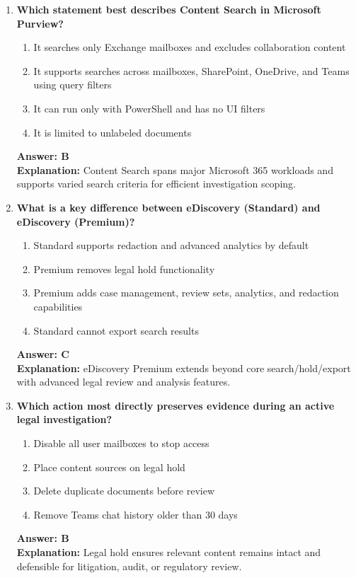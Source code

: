 \documentclass[10pt]{article}
\begin{document}
\begin{enumerate}[leftmargin=*]
\item \textbf{Which statement best describes Content Search in Microsoft Purview?}
\begin{enumerate}[label=\Alph*.]
  \item It searches only Exchange mailboxes and excludes collaboration content
  \item It supports searches across mailboxes, SharePoint, OneDrive, and Teams using query filters
  \item It can run only with PowerShell and has no UI filters
  \item It is limited to unlabeled documents
\end{enumerate}
\textbf{Answer: B}\\
\textbf{Explanation:} Content Search spans major Microsoft 365 workloads and supports varied search criteria for efficient investigation scoping.

\item \textbf{What is a key difference between eDiscovery (Standard) and eDiscovery (Premium)?}
\begin{enumerate}[label=\Alph*.]
  \item Standard supports redaction and advanced analytics by default
  \item Premium removes legal hold functionality
  \item Premium adds case management, review sets, analytics, and redaction capabilities
  \item Standard cannot export search results
\end{enumerate}
\textbf{Answer: C}\\
\textbf{Explanation:} eDiscovery Premium extends beyond core search/hold/export with advanced legal review and analysis features.

\item \textbf{Which action most directly preserves evidence during an active legal investigation?}
\begin{enumerate}[label=\Alph*.]
  \item Disable all user mailboxes to stop access
  \item Place content sources on legal hold
  \item Delete duplicate documents before review
  \item Remove Teams chat history older than 30 days
\end{enumerate}
\textbf{Answer: B}\\
\textbf{Explanation:} Legal hold ensures relevant content remains intact and defensible for litigation, audit, or regulatory review.


\end{enumerate}
\end{document}

